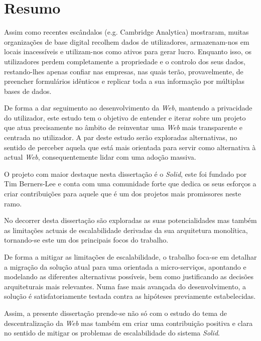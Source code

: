 \chapter*{Resumo}
Assim como recentes escândalos (e.g. Cambridge Analytica) mostraram, muitas organizações de base digital recolhem dados de utilizadores, armazenam-nos em locais inacessíveis e utilizam-nos como ativos para gerar lucro. Enquanto isso, os utilizadores perdem completamente a propriedade e o controlo dos seus dados, restando-lhes apenas confiar nas  empresas, nas quais terão, provavelmente, de preencher formulários idênticos e replicar toda a sua informação por múltiplas bases de dados.

De forma a dar seguimento ao desenvolvimento da \emph{Web}, mantendo a privacidade do utilizador, este estudo tem o objetivo de entender e iterar sobre um projeto que atua precisamente no âmbito de reinventar uma \emph{Web} mais transparente e centrada no utilizador. A par deste estudo serão exploradas alternativas, no sentido de perceber aquela que está mais orientada para servir como alternativa à actual \emph{Web}, consequentemente lidar com uma adoção massiva.

O projeto com maior destaque nesta dissertação é o \emph{Solid}, este foi fundado por Tim Berners-Lee e conta com uma comunidade forte que dedica os seus esforços a criar contribuições para aquele que é um dos projetos mais promissores neste ramo. 

No decorrer desta dissertação são exploradas as suas potencialidades mas também as limitações actuais de escalabilidade derivadas da sua arquitetura monolítica, tornando-se este um dos principais focos do trabalho.

De forma a mitigar as limitações de escalabilidade, o trabalho foca-se em detalhar a migração da solução atual para uma orientada a micro-serviços, apontando e modelando as diferentes alternativas possíveis, bem como justificando as decisões arquiteturais mais relevantes. Numa fase mais avançada do desenvolvimento, a solução é    satisfatoriamente testada contra as hipóteses previamente estabelecidas.

Assim, a presente dissertação prende-se não só com o estudo do tema de descentralização da \emph{Web} mas também em criar uma contribuição positiva e clara no sentido de mitigar os problemas de escalabilidade do sistema \emph{Solid}.
